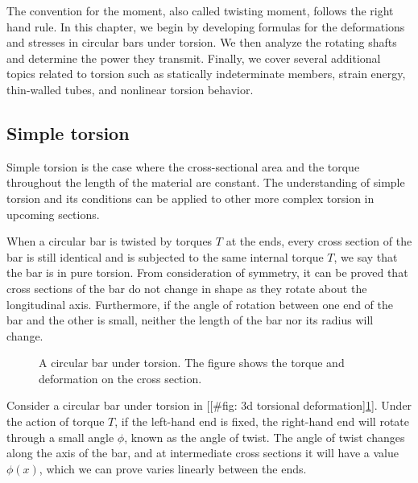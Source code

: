 \documentclass[a4paper,openany,12pt]{book}
\begin{document}
The convention for the moment, also called twisting moment, follows the
right hand rule. In this chapter, we begin by developing formulas for
the deformations and stresses in circular bars under torsion. We then
analyze the rotating shafts and determine the power they transmit.
Finally, we cover several additional topics related to torsion such as
statically indeterminate members, strain energy, thin-walled tubes, and
nonlinear torsion behavior.

\subsection{Simple torsion}
\label{simple-torsion}
Simple torsion is the case where the cross-sectional area and the torque
throughout the length of the material are constant. The understanding of
simple torsion and its conditions can be applied to other more complex
torsion in upcoming sections.

When a circular bar is twisted by torques \(T\) at the ends, every cross
section of the bar is still identical and is subjected to the same
internal torque \(T\), we say that the bar is in pure torsion. From
consideration of symmetry, it can be proved that cross sections of the
bar do not change in shape as they rotate about the longitudinal axis.
Furthermore, if the angle of rotation between one end of the bar and the
other is small, neither the length of the bar nor its radius will
change.

\begin{figure}[h]
  \centering
  \caption{A circular bar under torsion. The figure shows the torque and deformation on the cross section.}
  \label{fig: 3d torsional deformation}
\end{figure}

Consider a circular bar under torsion in
[[\#fig: 3d torsional deformation]\ref{fig: 3d torsional deformation}].
Under the action of torque \(T\), if the left-hand end is fixed, the
right-hand end will rotate through a small angle \(\phi\), known as the
angle of twist. The angle of twist changes along the axis of the bar,
and at intermediate cross sections it will have a value \(\phi(x)\), which
we can prove varies linearly between the ends.
\end{document}
